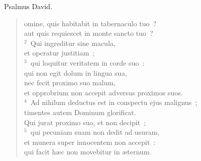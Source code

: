 \bchapter[Psalm]
Psalmus David. \begin{verse}omine, quis habitabit in tabernaculo tuo~?\\ aut quis requiescet in monte sancto tuo~?\\
${}^{2}$~Qui ingreditur sine macula,\\ et operatur justitiam~;\\
${}^{3}$~qui loquitur veritatem in corde suo~:\\ qui non egit dolum in lingua sua,\\ nec fecit proximo suo malum,\\ et opprobrium non accepit adversus proximos suos.\\
${}^{4}$~Ad nihilum deductus est in conspectu ejus malignus~;\\ timentes autem Dominum glorificat.\\ Qui jurat proximo suo, et non decipit~;\\
${}^{5}$~qui pecuniam suam non dedit ad usuram,\\ et munera super innocentem non accepit~:\\ qui facit h\ae c non movebitur in \ae ternum.\end{verse}



